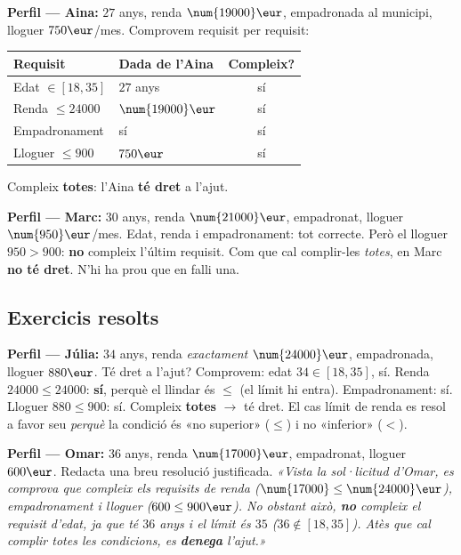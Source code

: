 \begin{exemple}
\textbf{Perfil — Aina:} $27$ anys, renda $\num{19000}\eur$, empadronada al municipi,
lloguer $750\eur$/mes. Comprovem requisit per requisit:
\begin{center}
\begin{tabular}{l l c}
\toprule
\textbf{Requisit} & \textbf{Dada de l'Aina} & \textbf{Compleix?} \\
\midrule
Edat $\in[18,35]$ & $27$ anys & sí \\
Renda $\le\num{24000}$ & $\num{19000}\eur$ & sí \\
Empadronament & sí & sí \\
Lloguer $\le 900$ & $750\eur$ & sí \\
\bottomrule
\end{tabular}
\end{center}
Compleix \textbf{totes}: l'Aina \textbf{té dret} a l'ajut.
\end{exemple}

\begin{exemple}
\textbf{Perfil — Marc:} $30$ anys, renda $\num{21000}\eur$, empadronat, lloguer
$\num{950}\eur$/mes. Edat, renda i empadronament: tot correcte. Però el lloguer
$\num{950}>900$: \textbf{no} compleix l'últim requisit. Com que cal complir-les
\emph{totes}, en Marc \textbf{no té dret}. N'hi ha prou que en falli una.
\end{exemple}

\subsection{Exercicis resolts}

\begin{exresolt}
\textbf{Perfil — Júlia:} $34$ anys, renda \emph{exactament} $\num{24000}\eur$,
empadronada, lloguer $880\eur$. Té dret a l'ajut?
\solucio
Comprovem: edat $34\in[18,35]$, sí. Renda $\num{24000}\le\num{24000}$: \textbf{sí},
perquè el llindar és $\le$ (el límit hi entra). Empadronament: sí. Lloguer
$880\le 900$: sí. Compleix \textbf{totes} $\rightarrow$ té dret. El cas límit de renda
es resol a favor seu \emph{perquè} la condició és «no superior» ($\le$) i no «inferior» ($<$).
\end{exresolt}

\begin{exresolt}
\textbf{Perfil — Omar:} $36$ anys, renda $\num{17000}\eur$, empadronat, lloguer
$600\eur$. Redacta una breu resolució justificada.
\solucio
\textit{«Vista la sol·licitud d'Omar, es comprova que compleix els requisits de
renda ($\num{17000}\le\num{24000}\eur$), empadronament i lloguer ($600\le 900\eur$).
No obstant això, \textbf{no} compleix el requisit d'edat, ja que té $36$ anys i el
límit és $35$ ($36\notin[18,35]$). Atès que cal complir totes les condicions,
es \textbf{denega} l'ajut.»}
\end{exresolt}

